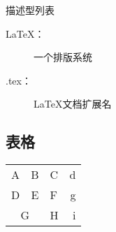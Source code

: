 \documentclass[10pt,UTF8]{ctexart}     %
\begin{document}
	描述型列表 %
	\begin{description}
		\item[LaTeX：] 一个排版系统
		\item[.tex：] LaTeX文档扩展名
	\end{description}
	
	\subsection{表格}
	\begin{center}  %
		\begin{tabular}[t]{|l|c||p{3em}r@{-}}
		
			\hline\hline   %
			A&B&C&d\\      %
			D&E&F&g\\
			\cline{1-2}   %
			\multicolumn{2}{|c|}{G}&H&i\\  %
			\hline
		\end{tabular}
	\end{center}

	
\end{document}

